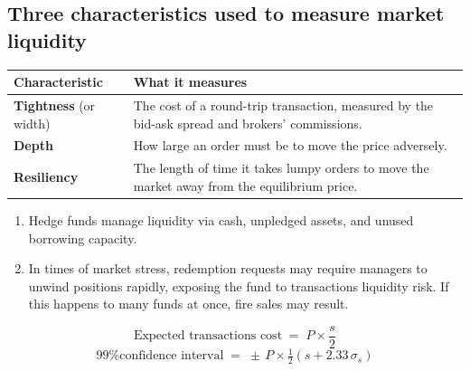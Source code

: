 \subsection{Three characteristics used to measure market liquidity}

\begin{center}
\small
\begin{tabularx}{\textwidth}{@{}p{3cm} X@{}}
\toprule
\rowcolor{FRMSoft}\textbf{Characteristic} & \textbf{What it measures} \\
\midrule
\textbf{Tightness} (or width) & The cost of a round-trip transaction, measured by the bid-ask spread and brokers' commissions. \\
\textbf{Depth} & How large an order must be to move the price adversely. \\
\textbf{Resiliency} & The length of time it takes lumpy orders to move the market away from the equilibrium price. \\
\bottomrule
\end{tabularx}
\end{center}

\begin{lrkeybox}
\begin{enumerate}[label=\alph*)]
\item Hedge funds manage liquidity via cash, unpledged assets, and unused borrowing capacity.
\item In times of market stress, redemption requests may require managers to unwind positions rapidly, exposing the fund to transactions liquidity risk. If this happens to many funds at once, fire sales may result.
\end{enumerate}
\end{lrkeybox}


\begin{lrfmlbox}
\[ \text{Expected transactions cost} \;=\; P \times \frac{s}{2} \]
\[ \text{99\% confidence interval} \;=\; \pm\, P \times \tfrac{1}{2}\left(s + 2.33\,\sigma_s\right) \]
\end{lrfmlbox}

